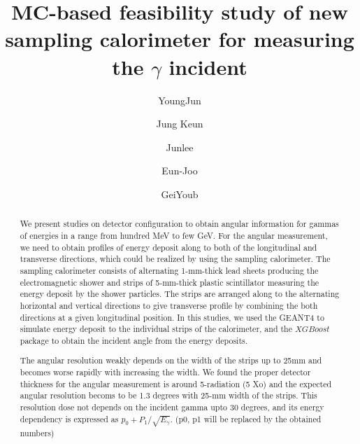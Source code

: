 \documentclass[jkps,preprint,fleqn,showpacs,showkeys]{revtex4}
\newcommand{\XGB}{XGBoost}
\begin{document}
\setcounter{page}{0}
\title[]{ MC-based feasibility study of new sampling calorimeter for measuring the $\gamma$ incident }

\author{YoungJun }
\author{Jung Keun }
\author{Junlee }
\author{Eun-Joo }
\author{GeiYoub  }


\begin{abstract}
We present studies on detector configuration to obtain angular information for gammas of energies in a range from hundred MeV to few GeV. For the angular measurement, we need to obtain profiles of energy deposit along to both of the longitudinal and transverse directions, which could be realized by using the sampling calorimeter. The sampling calorimeter consists of alternating 1-mm-thick lead sheets producing the electromagnetic shower and strips of 5-mm-thick plastic scintillator measuring the energy deposit by the shower particles. The strips are arranged along to the alternating horizontal and vertical directions to give transverse profile by combining the both directions at a given longitudinal position. In this studies, we used the GEANT4 to simulate energy deposit to the individual strips of the calorimeter, and the $\XGB$ package to obtain the incident angle from the energy deposits. 

The angular resolution weakly depends on the width of the strips up to 25mm and becomes worse rapidly with increasing the width. We found the proper detector thickness for the angular measurement is around 5-radiation (5 Xo) and the expected angular resolution becoms to be 1.3 degrees with 25-mm width of the strips. This resolution dose not depends on the incident gamma upto 30 degrees, and its energy dependency is expressed as $p_0 + P_1 / \sqrt{E_\gamma}$. (p0, p1 will be replaced by the obtained numbers) 


\end{abstract}
\end{document}
